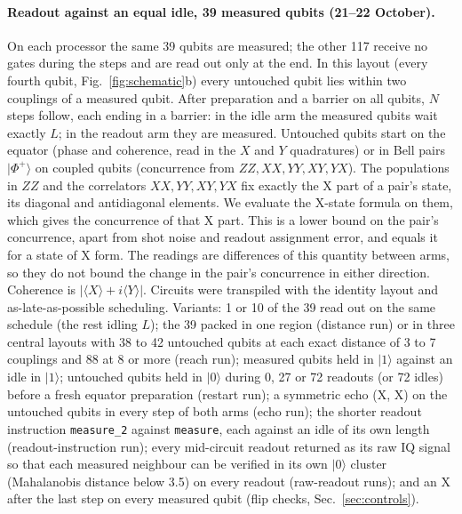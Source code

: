 \documentclass[reprint,amsmath,amssymb,aps,superscriptaddress,nofootinbib]{revtex4-2}
\begin{document}
\paragraph*{Readout against an equal idle, 39 measured qubits (21--22 October).} On each processor the same 39 qubits are measured; the other 117 receive no gates during the steps and are read out only at the end. In this layout (every fourth qubit, Fig.~\ref{fig:schematic}b) every untouched qubit lies within two couplings of a measured qubit. After preparation and a barrier on all qubits, $N$ steps follow, each ending in a barrier: in the idle arm the measured qubits wait exactly $L$; in the readout arm they are measured. Untouched qubits start on the equator (phase and coherence, read in the $X$ and $Y$ quadratures) or in Bell pairs $|\Phi^+\rangle$ on coupled qubits (concurrence from $ZZ,XX,YY,XY,YX$). The populations in $ZZ$ and the correlators $XX,YY,XY,YX$ fix exactly the X part of a pair's state, its diagonal and antidiagonal elements. We evaluate the X-state formula on them, which gives the concurrence of that X part. This is a lower bound on the pair's concurrence, apart from shot noise and readout assignment error, and equals it for a state of X form. The readings are differences of this quantity between arms, so they do not bound the change in the pair's concurrence in either direction. Coherence is $|\langle X\rangle+i\langle Y\rangle|$. Circuits were transpiled with the identity layout and as-late-as-possible scheduling. Variants: 1 or 10 of the 39 read out on the same schedule (the rest idling $L$); the 39 packed in one region (distance run) or in three central layouts with 38 to 42 untouched qubits at each exact distance of 3 to 7 couplings and 88 at 8 or more (reach run); measured qubits held in $|1\rangle$ against an idle in $|1\rangle$; untouched qubits held in $|0\rangle$ during 0, 27 or 72 readouts (or 72 idles) before a fresh equator preparation (restart run); a symmetric echo (X, X) on the untouched qubits in every step of both arms (echo run); the shorter readout instruction \texttt{measure\_2} against \texttt{measure}, each against an idle of its own length (readout-instruction run); every mid-circuit readout returned as its raw IQ signal so that each measured neighbour can be verified in its own $|0\rangle$ cluster (Mahalanobis distance below 3.5) on every readout (raw-readout runs); and an X after the last step on every measured qubit (flip checks, Sec.~\ref{sec:controls}).
\end{document}
